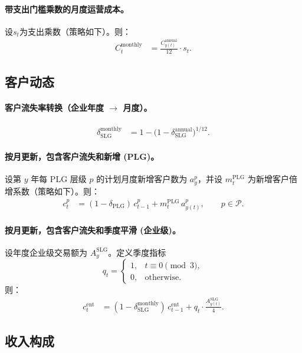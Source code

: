\documentclass[11pt, a4paper, oneside]{article}
\begin{document}
\paragraph{带支出门槛乘数的月度运营成本。}
设$s_t$为支出乘数（策略如下）。则：
\begin{align}
C^{\mathrm{monthly}}_t 
  &= \frac{C^{\mathrm{annual}}_{y(t)}}{12} \cdot s_t.
\end{align}

\subsection{客户动态}
\paragraph{客户流失率转换（企业年度 $\to$ 月度）。}
\begin{align}
\delta^{\mathrm{monthly}}_{\mathrm{SLG}} 
  &= 1 - \bigl(1 - \delta^{\mathrm{annual}}_{\mathrm{SLG}}\bigr)^{1/12}.
\end{align}

\paragraph{按月更新，包含客户流失和新增 (PLG)。}
设第 $y$ 年每 PLG 层级 $p$ 的计划月度新增客户数为 $a^p_y$，并设 $m^{\mathrm{PLG}}_t$ 为新增客户倍增系数（策略如下）。则：
\begin{align}
c^p_t 
  &= (1-\delta_{\mathrm{PLG}})\, c^p_{t-1} + m^{\mathrm{PLG}}_t \, a^p_{y(t)}, 
  \qquad p \in \mathcal{P}.
\end{align}

\paragraph{按月更新，包含客户流失和季度平滑 (企业级)。}
设年度企业级交易额为 $A^{\mathrm{SLG}}_{y}$。定义季度指标
\[
q_t = 
\begin{cases}
1, & t \equiv 0 \pmod{3},\\
0, & \text{otherwise}.
\end{cases}
\]
则：
\begin{align}
c^{\mathrm{ent}}_t 
  &= (1-\delta^{\mathrm{monthly}}_{\mathrm{SLG}})\, c^{\mathrm{ent}}_{t-1}
     + q_t \cdot \frac{A^{\mathrm{SLG}}_{y(t)}}{4}.
\end{align}

\subsection{收入构成}
\end{document}
